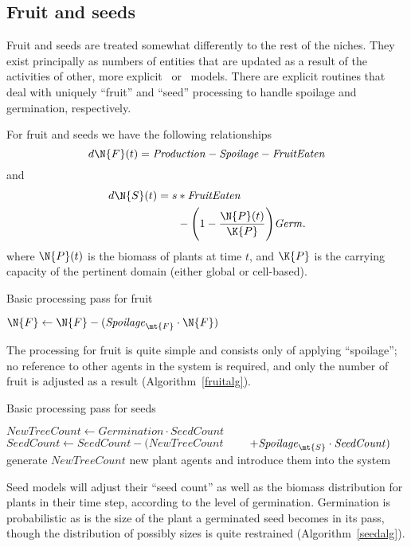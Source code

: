 
\subsection*{Fruit and seeds}
Fruit and seeds are treated somewhat differently to the rest of the
niches. They exist principally as numbers of entities that are updated
as a result of the activities of other, more explicit \SD\ or
\IB\ models.  There are explicit routines that deal with uniquely
``fruit'' and ``seed'' processing to handle spoilage and germination,
respectively.

For fruit and seeds we have the following relationships
\begin{equation*}
   d\N{F}(t) = \mathit{Production} - \mathit{Spoilage} - \mathit{FruitEaten}
\end{equation*}
and
\begin{align*}
  d\N{S}(t) = s &* \mathit{FruitEaten} \\
  &- \Biggl(1 - \frac{\N{P}(t)}{\K{P}}\Biggr)\mathit{Germ}.
\end{align*}
where $\N{P}(t)$ is the biomass of plants at time $t$, and $\K{P}$ is
the carrying capacity of the pertinent domain (either global or
cell-based).
\begin{algorithm}\label{fruitalg}
  \caption{Basic processing pass for fruit}
  \begin{algorithmic}
    \State $\N{F} \gets \N{F} - (\mathit{Spoilage}_{\mt{F}} \cdot \N{F})$
  \end{algorithmic}
\end{algorithm}
The processing for fruit is quite simple and consists only of
applying ``spoilage''; no reference to other agents in
the system is required, and only the number of fruit is adjusted as a
result (Algorithm~\ref{fruitalg}).
\begin{algorithm}\label{seedalg}
  \caption{Basic processing pass for seeds}
  \begin{algorithmic}
    \State $\mathit{NewTreeCount} \gets \mathit{Germination} \cdot  \mathit{SeedCount}$
    \State $\mathit{SeedCount} \gets \mathit{SeedCount} -  (\mathit{NewTreeCount} $
    \State $\qquad + \mathit{Spoilage}_{\mt{S}} \cdot \mathit{SeedCount})$
    \State generate $NewTreeCount$ new plant agents and introduce them into the system
  \end{algorithmic}
\end{algorithm}
Seed models will adjust their ``seed count'' as well as the biomass
distribution for plants in their time step, according to the level of
germination. Germination is probabilistic as is the size of the plant
a germinated seed becomes in its pass, though the distribution of
possibly sizes is quite restrained (Algorithm~\ref{seedalg}).

